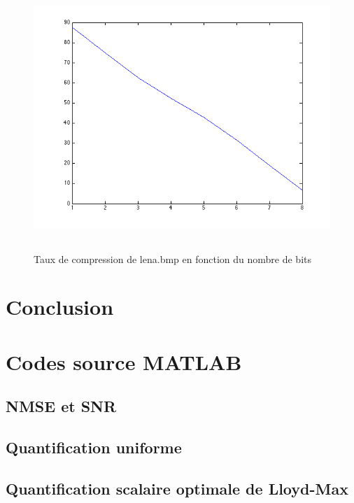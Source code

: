 \documentclass[a4paper, 12pt]{article}
\newcommand{\FSource}[1]{%

}
\begin{document}
\begin{figure}[H]
	\centering
		\includegraphics[width=12cm, height=10cm]{../taux_compression_vs_nb_bits.png}
	\caption{Taux de compression de lena.bmp en fonction du nombre de bits}
	\label{fig:courbe_compression}
\end{figure}


\newpage

\section{Conclusion}


\clearpage
\appendix

\section{Codes source MATLAB}
\subsection{NMSE et SNR}\label{nmse_snr_code}

\FSource{../disto_1_1.m}

\newpage

\subsection{Quantification uniforme}\label{quant_uni_code}

\FSource{../quant_uni_1_2.m}

\newpage

\subsection{Quantification scalaire optimale de Lloyd-Max}\label{quant_lloyd}

\FSource{../lloyd_max_2_1.m}
\end{document}
